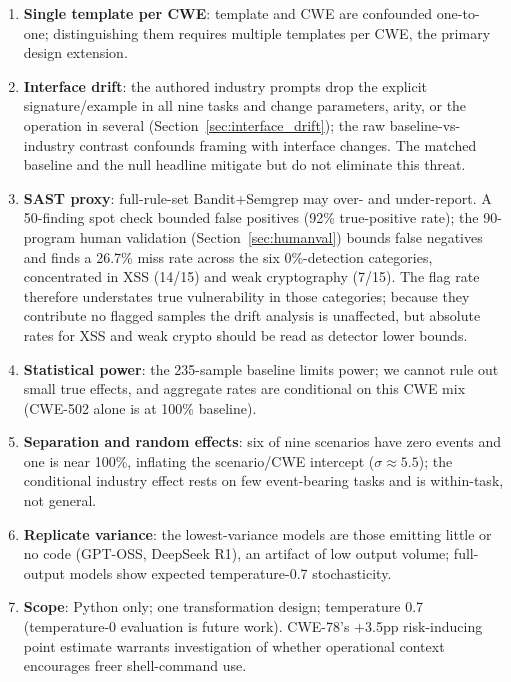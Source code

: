 \documentclass[sigconf,review,anonymous]{acmart}
\begin{document}
\begin{enumerate}
    \item \textbf{Single template per CWE}: template and CWE are confounded one-to-one; distinguishing them requires multiple templates per CWE, the primary design extension.
    \item \textbf{Interface drift}: the authored industry prompts drop the explicit signature/example in all nine tasks and change parameters, arity, or the operation in several (Section~\ref{sec:interface_drift}); the raw baseline-vs-industry contrast confounds framing with interface changes. The matched baseline and the null headline mitigate but do not eliminate this threat.
    \item \textbf{SAST proxy}: full-rule-set Bandit+Semgrep may over- and under-report. A 50-finding spot check bounded false positives (92\% true-positive rate); the 90-program human validation (Section~\ref{sec:humanval}) bounds false negatives and finds a 26.7\% miss rate across the six 0\%-detection categories, concentrated in XSS (14/15) and weak cryptography (7/15). The flag rate therefore understates true vulnerability in those categories; because they contribute no flagged samples the drift analysis is unaffected, but absolute rates for XSS and weak crypto should be read as detector lower bounds.
    \item \textbf{Statistical power}: the 235-sample baseline limits power; we cannot rule out small true effects, and aggregate rates are conditional on this CWE mix (CWE-502 alone is at 100\% baseline).
    \item \textbf{Separation and random effects}: six of nine scenarios have zero events and one is near 100\%, inflating the scenario/CWE intercept ($\sigma \approx 5.5$); the conditional industry effect rests on few event-bearing tasks and is within-task, not general.
    \item \textbf{Replicate variance}: the lowest-variance models are those emitting little or no code (GPT-OSS, DeepSeek R1), an artifact of low output volume; full-output models show expected temperature-0.7 stochasticity.
    \item \textbf{Scope}: Python only; one transformation design; temperature 0.7 (temperature-0 evaluation is future work). CWE-78's $+$3.5pp risk-inducing point estimate warrants investigation of whether operational context encourages freer shell-command use.
\end{enumerate}

\end{document}
